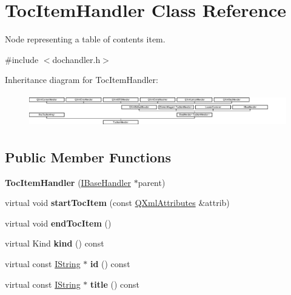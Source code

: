 \hypertarget{class_toc_item_handler}{}\section{Toc\+Item\+Handler Class Reference}
\label{class_toc_item_handler}


Node representing a table of contents item.  




{\ttfamily \#include $<$dochandler.\+h$>$}

Inheritance diagram for Toc\+Item\+Handler\+:\begin{figure}[H]
\begin{center}
\leavevmode
\includegraphics[height=1.454545cm]{class_toc_item_handler}
\end{center}
\end{figure}
\subsection*{Public Member Functions}
\begin{DoxyCompactItemize}
\item 
\mbox{\label{class_toc_item_handler_acfd87c9d47c15a5d86ad43df421775af}} 
{\bfseries Toc\+Item\+Handler} (\mbox{\hyperlink{class_i_base_handler}{I\+Base\+Handler}} $\ast$parent)
\item 
\mbox{\label{class_toc_item_handler_a4e38e3bfa24aa30c2f72d98c37f93002}} 
virtual void {\bfseries start\+Toc\+Item} (const \mbox{\hyperlink{class_q_xml_attributes}{Q\+Xml\+Attributes}} \&attrib)
\item 
\mbox{\label{class_toc_item_handler_abfe391c3318fe4338ee374fbb15a3a89}} 
virtual void {\bfseries end\+Toc\+Item} ()
\item 
\mbox{\label{class_toc_item_handler_a98de3c192f02a41d1ee9621f844beda5}} 
virtual Kind {\bfseries kind} () const
\item 
\mbox{\label{class_toc_item_handler_ae821c12eba8e0f5b395d13bd435bb454}} 
virtual const \mbox{\hyperlink{class_i_string}{I\+String}} $\ast$ {\bfseries id} () const
\item 
\mbox{\label{class_toc_item_handler_af1b68106a7bdd51607530f2cc242a1e8}} 
virtual const \mbox{\hyperlink{class_i_string}{I\+String}} $\ast$ {\bfseries title} () const
\end{DoxyCompactItemize}
